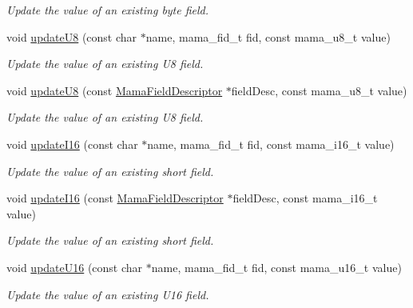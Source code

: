 \begin{DoxyCompactItemize}
\begin{DoxyCompactList}\small\item\em Update the value of an existing byte field. \item\end{DoxyCompactList}\item 
void \hyperlink{classWombat_1_1MamaMsg_ac8c7b1099e92b2dded67b7996088cf56}{updateU8} (const char $\ast$name, mama\_\-fid\_\-t fid, const mama\_\-u8\_\-t value)
\begin{DoxyCompactList}\small\item\em Update the value of an existing U8 field. \item\end{DoxyCompactList}\item 
void \hyperlink{classWombat_1_1MamaMsg_aea2247f13eccf998889109ff12bda0a9}{updateU8} (const \hyperlink{classWombat_1_1MamaFieldDescriptor}{MamaFieldDescriptor} $\ast$fieldDesc, const mama\_\-u8\_\-t value)
\begin{DoxyCompactList}\small\item\em Update the value of an existing U8 field. \item\end{DoxyCompactList}\item 
void \hyperlink{classWombat_1_1MamaMsg_a1be4993c69f8b7b9a022269080b06e70}{updateI16} (const char $\ast$name, mama\_\-fid\_\-t fid, const mama\_\-i16\_\-t value)
\begin{DoxyCompactList}\small\item\em Update the value of an existing short field. \item\end{DoxyCompactList}\item 
void \hyperlink{classWombat_1_1MamaMsg_a559ab92bac1931b49065b1fd00f41694}{updateI16} (const \hyperlink{classWombat_1_1MamaFieldDescriptor}{MamaFieldDescriptor} $\ast$fieldDesc, const mama\_\-i16\_\-t value)
\begin{DoxyCompactList}\small\item\em Update the value of an existing short field. \item\end{DoxyCompactList}\item 
void \hyperlink{classWombat_1_1MamaMsg_aef7f564a13e3d87bc292e54234f6a495}{updateU16} (const char $\ast$name, mama\_\-fid\_\-t fid, const mama\_\-u16\_\-t value)
\begin{DoxyCompactList}\small\item\em Update the value of an existing U16 field. \item\end{DoxyCompactList}\item 

\end{DoxyCompactItemize}
